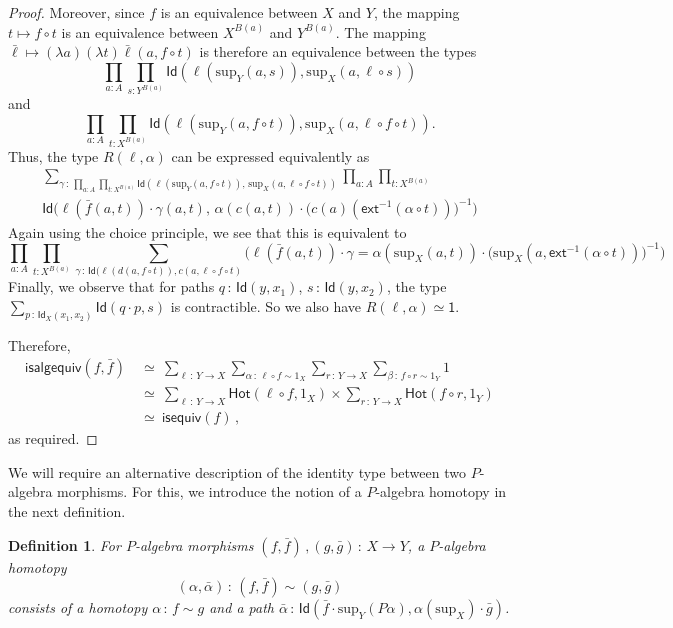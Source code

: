 \documentclass[10pt,a4paper,oneside,reqno]{amsart}
\theoremstyle{mythm}
\theoremstyle{mydef}
\newtheorem{definition}[theorem]{Definition}
\theoremstyle{myrmk}
\newcommand{\co}{\,{:}\,}
\newcommand{\com}{\circ}
\newcommand{\ct}{\cdot}
\newcommand{\isequiv}{\mathsf{isequiv}}
\newcommand{\Hot}{\mathsf{Hot}}
\newcommand{\ext}{\mathsf{ext}}
\newcommand{\one}{\mathsf{1}}
\newcommand{\Id}{\mathsf{Id}}
\renewcommand{\sup}{\mathrm{sup}}
\newcommand{\isalgequiv}{\mathsf{isalgequiv}}
\begin{document}
\begin{proof}
Moreover, since $f$ is an equivalence between $X$ and $Y$, the mapping $t \mapsto f \com t$ is an equivalence between $X^{B(a)}$ and $Y^{B(a)}$. The mapping $\bar{\ell} \mapsto (\lambda a) (\lambda t) \bar{\ell}(a,f \com t)$ is therefore an equivalence between the types $$\prod_{a:A}\prod_{s: Y^{B(a)}}\Id(\ell(\sup_Y(a,s)), \sup_X(a,\ell \com s))$$ and $$ \prod_{a:A}\prod_{t: X^{B(a)}} \Id(\ell(\sup_Y(a,f \com t)), \sup_X(a,\ell \com f \com t)).$$ 
Thus, the type $R(\ell,\alpha)$ can be expressed equivalently as
\[
\begin{split}
\sum_{\gamma \co \prod_{a:A}\prod_{t: X^{B(a)}} \Id(\ell(\sup_Y(a,f \circ t)),\, \sup_X(a,\ell \circ f \circ t))}
	 \prod_{a:A}\prod_{t: X^{B(a)}}\\
	\Id\big(\ell(\bar{f}(a,t)) \ct \gamma(a,t),\, \alpha(c(a,t)) \ct \big(c(a)(\ext^{-1}(\alpha \circ t))\big)^{-1}\big)
\end{split}
\]
Again using the choice principle, we see that this is equivalent to
\[ 
 \prod_{a:A}\prod_{t: X^{B(a)}}
 \sum_{\gamma \co \Id(\ell(d(a,f \circ t)), c(a,\ell \circ f \circ t)}
  \big(\ell(\bar{f}(a,t)) \ct \gamma = \alpha(\sup_X(a,t)) \ct \big(\sup_X(a, \ext^{-1}(\alpha \circ t))\big)^{-1}\big) 
  \]
Finally, we observe that for paths $q \co \Id(y,x_1)$, $s \co \Id(y,x_2)$, the type $\sum_{ p \co \Id_X(x_1,x_2)} \Id(q \ct p,s)$ is contractible. So we also have $R(\ell,\alpha) \simeq \one$. 

Therefore,
\begin{align*} 
\isalgequiv(f,\bar{f})\ 
  & \simeq\  \sum_{\ell \co Y \to X} \sum_{ \alpha \co \ell \com f \sim 1_X} \sum_{ r  \co Y \to X}
\sum_{\beta \co f \com r \sim 1_Y} 1 \\
 & \simeq\ \sum_{\ell \co Y \to X} \Hot( \ell \com f,1_X )\times 
		\sum_{r  \co Y \to X} \Hot( f \com r, 1_Y)  \\
 & \simeq\ \isequiv(f) \, ,
\end{align*} 
as required.
\end{proof}







We will require an alternative description of the identity type between two $P$-algebra morphisms. For this, we introduce 
the notion of a $P$-algebra homotopy in the next definition.


\begin{definition}
For $P$-algebra morphisms $(f, \bar{f}) \, , (g, \bar{g}) \co X \to Y$, a \emph{$P$-algebra homotopy}  
\[
(\alpha, \bar{\alpha}) \co (f, \bar{f}) \sim (g, \bar{g})
\] 
consists of a homotopy $\alpha \co f \sim g$ and a path
$\bar{\alpha} \co \Id( \bar{f} \cdot \sup_Y (P \alpha) ,  \alpha(\sup_X)\cdot \bar{g})$. 
\end{definition}
\end{document}
